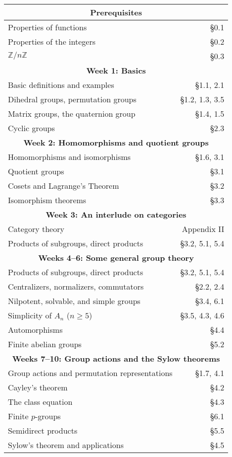 \documentclass[11pt]{article}
\begin{document}
\begin{tabular}[h]{|l|r|}
  \hline
\hline\multicolumn{2}{|c|}{\bf Prerequisites}\\
\hline
Properties of functions & \S 0.1\\
\hline
Properties of the integers & \S 0.2\\
\hline 
$\mathbb{Z}/n\mathbb{Z}$ & \S 0.3\\
\hline
\hline\multicolumn{2}{|c|}{\bf Week 1: Basics}
	\\\hline\hline Basic definitions and examples & \S1.1, 2.1
	\\\hline Dihedral groups, permutation groups &\S 1.2, 1.3, 3.5
	\\\hline Matrix groups, the quaternion group & \S 1.4, 1.5
	\\\hline Cyclic groups & \S 2.3
\\\hline \hline\multicolumn{2}{|c|}{\bf Week 2: Homomorphisms and quotient groups}
	\\\hline\hline Homomorphisms and isomorphisms & \S 1.6, 3.1
	\\\hline Quotient groups & \S 3.1
	\\\hline Cosets and Lagrange's Theorem & \S 3.2
	\\\hline Isomorphism theorems & \S 3.3
\\\hline\hline\multicolumn{2}{|c|}{\bf Week 3: An interlude on
  categories}
  \\\hline\hline Category theory & Appendix II
  \\ \hline Products of subgroups, direct products & \S 3.2, 5.1, 5.4
\\\hline \hline\multicolumn{2}{|c|}{\bf Weeks 4--6: Some general group theory}
	\\\hline\hline Products of subgroups, direct products & \S 3.2, 5.1, 5.4
	\\\hline Centralizers, normalizers, commutators & \S 2.2, 2.4
	\\\hline Nilpotent, solvable, and simple groups & \S 3.4, 6.1
	\\\hline Simplicity of $A_n$ ($n \geq 5$) & \S 3.5, 4.3, 4.6
	\\\hline Automorphisms & \S 4.4
	\\\hline Finite abelian groups & \S 5.2
\\\hline \hline\multicolumn{2}{|c|}{\bf Weeks 7--10: Group actions and the Sylow theorems}
	\\\hline\hline Group actions and permutation representations & \S 1.7, 4.1
	\\\hline Cayley's theorem & \S 4.2
	\\\hline The class equation & \S 4.3
	\\\hline Finite $p$-groups & \S 6.1
	\\\hline Semidirect products & \S 5.5
	\\\hline Sylow's theorem and applications & \S 4.5\\
\hline
	\end{tabular}
\end{document}
